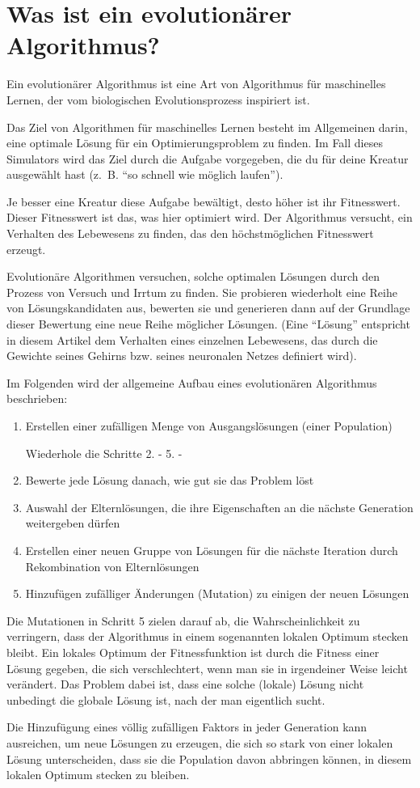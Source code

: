 \documentclass[a4paper]{scrartcl}
\begin{document}
\newpage

\section*{Was ist ein evolutionärer Algorithmus?}

Ein evolutionärer Algorithmus ist eine Art von Algorithmus für maschinelles Lernen, der vom biologischen Evolutionsprozess inspiriert ist.


Das Ziel von Algorithmen für maschinelles Lernen besteht im Allgemeinen darin, eine optimale Lösung für ein Optimierungsproblem zu finden. Im Fall dieses Simulators wird das Ziel durch die Aufgabe vorgegeben, die du für deine Kreatur ausgewählt hast (z. B. \enquote{so schnell wie möglich laufen}).


Je besser eine Kreatur diese Aufgabe bewältigt, desto höher ist ihr Fitnesswert. Dieser Fitnesswert ist das, was hier optimiert wird. Der Algorithmus versucht, ein Verhalten des Lebewesens zu finden, das den höchstmöglichen Fitnesswert erzeugt.


Evolutionäre Algorithmen versuchen, solche optimalen Lösungen durch den Prozess von Versuch und Irrtum zu finden. Sie probieren wiederholt eine Reihe von Lösungskandidaten aus, bewerten sie und generieren dann auf der Grundlage dieser Bewertung eine neue Reihe möglicher Lösungen. (Eine \enquote{Lösung} entspricht in diesem Artikel dem Verhalten eines einzelnen Lebewesens, das durch die Gewichte seines Gehirns bzw. seines neuronalen Netzes definiert wird).


Im Folgenden wird der allgemeine Aufbau eines evolutionären Algorithmus beschrieben:

\begin{enumerate}
  \item Erstellen einer zufälligen Menge von Ausgangslösungen (einer Population)

  Wiederhole die Schritte 2. - 5. -
  \item Bewerte jede Lösung danach, wie gut sie das Problem löst
  \item Auswahl der Elternlösungen, die ihre Eigenschaften an die nächste Generation weitergeben dürfen
  \item Erstellen einer neuen Gruppe von Lösungen für die nächste Iteration durch Rekombination von Elternlösungen
  \item Hinzufügen zufälliger Änderungen (Mutation) zu einigen der neuen Lösungen
\end{enumerate}


Die Mutationen in Schritt 5 zielen darauf ab, die Wahrscheinlichkeit zu verringern, dass der Algorithmus in einem sogenannten lokalen Optimum stecken bleibt. Ein lokales Optimum der Fitnessfunktion ist durch die Fitness einer Lösung gegeben, die sich verschlechtert, wenn man sie in irgendeiner Weise leicht verändert. Das Problem dabei ist, dass eine solche (lokale) Lösung nicht unbedingt die globale Lösung ist, nach der man eigentlich sucht.


Die Hinzufügung eines völlig zufälligen Faktors in jeder Generation kann ausreichen, um neue Lösungen zu erzeugen, die sich so stark von einer lokalen Lösung unterscheiden, dass sie die Population davon abbringen können, in diesem lokalen Optimum stecken zu bleiben.
\end{document}
